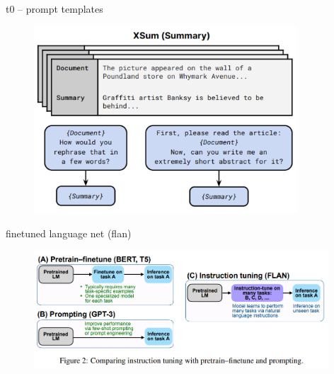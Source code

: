 \begin{frame}{t0 -- prompt templates}

\vfill
	
	\begin{figure}
		\centering
		\includegraphics[height=7cm]{figure/t0ex2}\\ 
	\end{figure}

\vfill

\end{frame}


\begin{frame}{finetuned language net (flan)}

\vfill
	
	\begin{figure}
		\centering
		\includegraphics[width = 11cm]{figure/81-flan.png}\\ 
	\end{figure}

\vfill

\end{frame}


